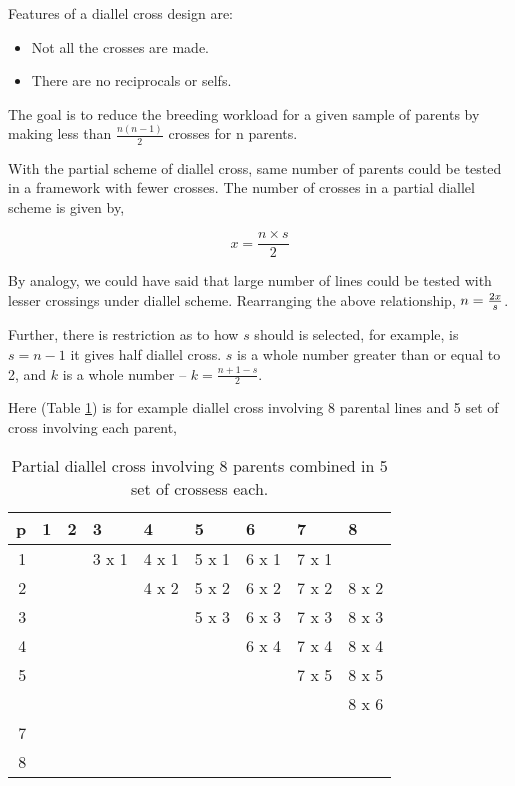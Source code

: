 \documentclass[
  answers,addpoints,12pt]{exam}
\begin{document}
Features of a diallel cross design are:

\begin{itemize}
\item Not all the crosses are made.
\item There are no reciprocals or selfs.
\end{itemize}

The goal is to reduce the breeding workload for a given sample of parents by making less than \(\frac{n(n-1)}{2}\) crosses for n parents.

With the partial scheme of diallel cross, same number of parents could be tested in a framework with fewer crosses. The number of crosses in a partial diallel scheme is given by,

\[
x = \frac{n \times s}{2}
\]

By analogy, we could have said that large number of lines could be tested with lesser crossings under diallel scheme. Rearranging the above relationship, \(\large n = \frac{2x}{s}\).

Further, there is restriction as to how \(s\) should is selected, for example, is \(s = n -1\) it gives half diallel cross. \(s\) is a whole number greater than or equal to 2, and \(k\) is a whole number -- \(k = \frac{n + 1 - s}{2}\).

Here (Table \ref{tab:partial-diallel-8p-table}) is for example diallel cross involving 8 parental lines and 5 set of cross involving each parent,

\begingroup\fontsize{8}{10}\selectfont

\begin{longtable}[t]{rllllllll}
\caption{\label{tab:partial-diallel-8p-table}Partial diallel cross involving 8 parents combined in 5 set of crossess each.}\\
\toprule
p & 1 & 2 & 3 & 4 & 5 & 6 & 7 & 8\\
\midrule
\rowcolor{gray!6}  1 &  &  & 3 x 1 & 4 x 1 & 5 x 1 & 6 x 1 & 7 x 1 & \\
2 &  &  &  & 4 x 2 & 5 x 2 & 6 x 2 & 7 x 2 & 8 x 2\\
\rowcolor{gray!6}  3 &  &  &  &  & 5 x 3 & 6 x 3 & 7 x 3 & 8 x 3\\
4 &  &  &  &  &  & 6 x 4 & 7 x 4 & 8 x 4\\
\rowcolor{gray!6}  5 &  &  &  &  &  &  & 7 x 5 & 8 x 5\\
\addlinespace
6 &  &  &  &  &  &  &  & 8 x 6\\
\rowcolor{gray!6}  7 &  &  &  &  &  &  &  & \\
8 &  &  &  &  &  &  &  & \\
\bottomrule
\end{longtable}
\endgroup{}
\end{document}
